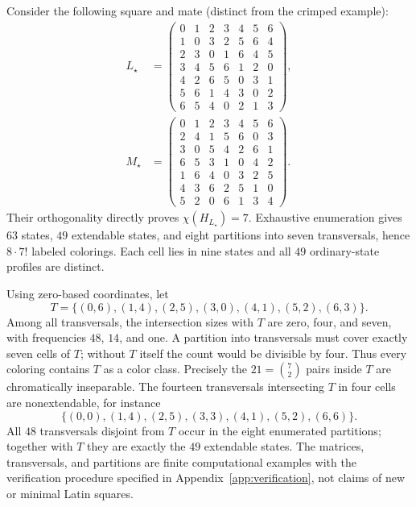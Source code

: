 \documentclass[aps,pra,reprint,superscriptaddress,longbibliography,nofootinbib,floatfix,10pt]{revtex4-2}
\theoremstyle{definition}\newtheorem{definition}[theorem]{Definition}
\theoremstyle{remark}\newtheorem{remark}[theorem]{Remark}
\begin{document}
Consider the following square and mate (distinct from the crimped example):
\begin{equation}\label{eq:seven-nonextendable}
\begin{aligned}
L_\star&=\begin{pmatrix}
0&1&2&3&4&5&6\\1&0&3&2&5&6&4\\2&3&0&1&6&4&5\\3&4&5&6&1&2&0\\4&2&6&5&0&3&1\\5&6&1&4&3&0&2\\6&5&4&0&2&1&3
\end{pmatrix},\\
M_\star&=\begin{pmatrix}
0&1&2&3&4&5&6\\2&4&1&5&6&0&3\\3&0&5&4&2&6&1\\6&5&3&1&0&4&2\\1&6&4&0&3&2&5\\4&3&6&2&5&1&0\\5&2&0&6&1&3&4
\end{pmatrix}.
\end{aligned}
\end{equation}
Their orthogonality directly proves $\chi(H_{L_\star})=7$. Exhaustive enumeration gives $63$ states, $49$ extendable states, and eight partitions into seven transversals, hence $8\cdot7!$ labeled colorings. Each cell lies in nine states and all $49$ ordinary-state profiles are distinct.

Using zero-based coordinates, let
\begin{equation}\label{eq:seven-forced-transversal}
T=\{(0,6),(1,4),(2,5),(3,0),(4,1),(5,2),(6,3)\}.
\end{equation}
Among all transversals, the intersection sizes with $T$ are zero, four, and seven, with frequencies $48$, $14$, and one. A partition into transversals must cover exactly seven cells of $T$; without $T$ itself the count would be divisible by four. Thus every coloring contains $T$ as a color class. Precisely the $21=\binom72$ pairs inside $T$ are chromatically inseparable. The fourteen transversals intersecting $T$ in four cells are nonextendable, for instance
\[
\{(0,0),(1,4),(2,5),(3,3),(4,1),(5,2),(6,6)\}.
\]
All $48$ transversals disjoint from $T$ occur in the eight enumerated partitions; together with $T$ they are exactly the $49$ extendable states. The matrices, transversals, and partitions are finite computational examples with the verification procedure specified in Appendix~\ref{app:verification}, not claims of new or minimal Latin squares.
\end{document}
